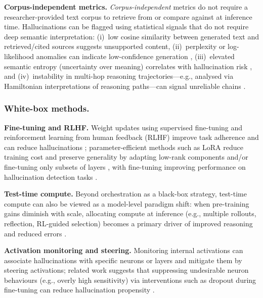 \noindent\textbf{Corpus-independent metrics.} \emph{Corpus-independent} metrics do not require a researcher-provided text corpus to retrieve from or compare against at inference time. Hallucinations can be flagged using statistical signals that do not require deep semantic interpretation: (i)~low cosine similarity between generated text and retrieved/cited sources suggests unsupported content, (ii)~perplexity or log-likelihood anomalies can indicate low-confidence generation \citep{varshney2023stitch}, (iii)~elevated semantic entropy (uncertainty over meaning) correlates with hallucination risk \citep{farquhar2024detecting}, and (iv)~instability in multi-hop reasoning trajectories---e.g., analysed via Hamiltonian interpretations of reasoning paths---can signal unreliable chains \citep{marin2024optimizing}.

\subsubsection{White-box methods.}

\noindent\textbf{Fine-tuning and RLHF.} Weight updates using supervised fine-tuning and reinforcement learning from human feedback (RLHF) improve task adherence and can reduce hallucinations \citep{ouyang2022rlhf}; parameter-efficient methods such as LoRA reduce training cost and preserve generality by adapting low-rank components and/or fine-tuning only subsets of layers \citep{hu2021lora}, with fine-tuning improving performance on hallucination detection tasks \citep{schopf-etal-2025-natural}.

\noindent\textbf{Test-time compute.} Beyond orchestration as a black-box strategy, test-time compute can also be viewed as a model-level paradigm shift: when pre-training gains diminish with scale, allocating compute at inference (e.g., multiple rollouts, reflection, RL-guided selection) becomes a primary driver of improved reasoning and reduced errors \citep{kaplan2020scaling}.

\noindent\textbf{Activation monitoring and steering.} Monitoring internal activations can associate hallucinations with specific neurons or layers and mitigate them by steering activations; related work suggests that suppressing undesirable neuron behaviours (e.g., overly high sensitivity) via interventions such as dropout during fine-tuning can reduce hallucination propensity \citep{wang2024adaptive, varshney2023stitch}.

